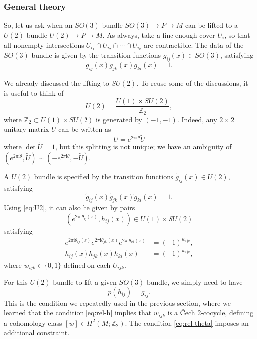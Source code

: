 \documentclass[12pt]{article}
\numberwithin{equation}{section}
\numberwithin{figure}{section}
\theoremstyle{remark}
\def\bZ{\mathbb{Z}}
\def\I{\mathrm{i}}
\begin{document}
\subsubsection{General theory}

So, let us ask when an $SO(3)$ bundle $SO(3)\to P\to M$ can be lifted to a $U(2)$ bundle $U(2)\to \tilde P\to M$.
As always, take a fine enough cover $U_i$, so that all nonempty intersections $U_{i_1}\cap U_{i_2}\cap \cdots \cap U_{i_k}$ are contractible.
The data of the $SO(3)$ bundle is given by the transition functions $g_{ij}(x)\in SO(3)$, satisfying \begin{equation}
  g_{ij}(x)g_{jk}(x)g_{ki}(x)=1.
\end{equation}

We already discussed the lifting to $SU(2)$. 
To reuse some of the discussions,
it is useful to think of \begin{equation}
U(2) = \frac{U(1)\times SU(2)}{\bZ_2}, \label{eq:U2}
\end{equation} where $\bZ_2 \subset U(1)\times SU(2)$ is generated by $(-1,-1)$.
Indeed, any $2\times 2$ unitary matrix $U$ can be written as \begin{equation}
U= e^{2\pi\I \theta} \tilde U
\end{equation} where $\det\tilde U=1$, but this splitting is not unique;
we have an ambiguity of $(e^{2\pi\I \theta},\tilde U) \sim (-e^{2\pi\I \theta},-\tilde U)$.

A $U(2)$ bundle is specified by the transition functions $\tilde g_{ij}(x)\in U(2)$, satisfying \begin{equation}
  \tilde g_{ij}(x)\tilde g_{jk}(x)\tilde g_{ki}(x)=1.
\end{equation}
Using \eqref{eq:U2}, it can also be given by pairs \begin{equation}
(e^{2\pi\I\theta_{ij}(x)},h_{ij}(x))\in U(1)\times SU(2)
\end{equation} satisfying \begin{align}
  e^{2\pi\I\theta_{ij}(x)}e^{2\pi\I\theta_{jk}(x)}e^{2\pi\I\theta_{ki}(x)}&=(-1)^{w_{ijk}},\label{eq:rel-theta}\\
  h_{ij}(x)h_{jk}(x)h_{ki}(x)&=(-1)^{w_{ijk}},\label{eq:rel-h}
\end{align}
where $w_{ijk}\in \{0,1\}$ defined on each $U_{ijk}$.

For this $U(2)$ bundle to lift a given $SO(3)$ bundle, we simply need to have \begin{equation}
p(h_{ij})=g_{ij}.
\end{equation}
This is the condition we repeatedly used in the previous section,
where we learned that the condition \eqref{eq:rel-h}
implies that  $w_{ijk}$ is a \v Cech 2-cocycle,
defining a cohomology class $[w]\in H^2(M;\bZ_2)$.
The condition \eqref{eq:rel-theta} imposes an additional constraint.
\end{document}
